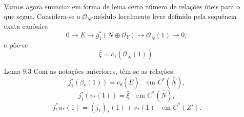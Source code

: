 Vamos agora enunciar em forma de lema certo número de relações úteis para o que segue. Considera-se o $\mathcal O_{\widehat N}$-módulo localmente livre definido pela sequência exata canônica
\[
0\to E\to g_1^*(N\oplus\mathcal O_Y)\to\mathcal O_{\widehat N}(1)\to0,
\tag{9.3.0}
\]
e põe-se
\[
\bar\xi=c_1(\mathcal O_{\widehat N}(1)).
\tag{9.3.1}
\]

\begin{statement}{Lema 9.3}
Com as notações anteriores, têm-se as relações:
\[
j_1^*(\beta_*(1))=c_d(\check E)\quad\text{em }C^*(\widehat N),
\tag{9.3.2}
\]
\[
j_1^*(v_*(1))=\bar\xi\quad\text{em }C^*(\widehat N),
\tag{9.3.3}
\]
\[
f_1^*u_*(1)=(j_1)_*(1)+v_*(1)\quad\text{em }C^*(Z').
\tag{9.3.4}
\]
\end{statement}
